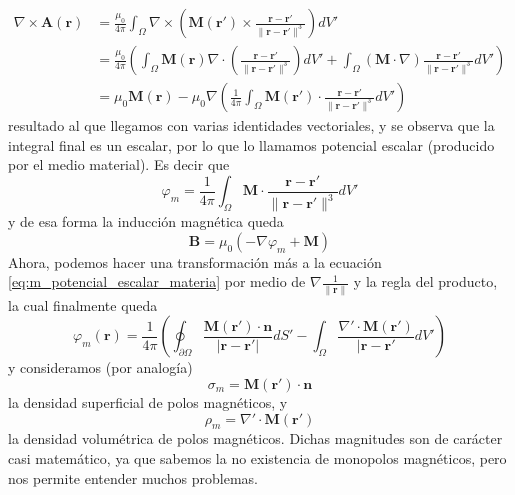 \documentclass[11pt,a4paper]{article}
\numberwithin{equation}{section}
\begin{document}
\begin{align*}
    \nabla \times \textbf{A}(\textbf{r}) &= \frac{\mu_0}{4\pi} \int_\Omega \nabla \times \left(\textbf{M}(\textbf{r}') \times \frac{\textbf{r} - \textbf{r}'}{\|\textbf{r} - \textbf{r}'\|^3}\right) dV' \\ &= \frac{\mu_0}{4\pi} \left(\int_{\Omega} \textbf{M}(\textbf{r}) \nabla\cdot\left(\frac{\textbf{r} - \textbf{r}'}{\|\textbf{r} - \textbf{r}'\|^3}\right) dV' + \int_{\Omega} (\textbf{M} \cdot \nabla) \frac{\textbf{r} - \textbf{r}'}{\|\textbf{r} - \textbf{r}'\|^3} dV'\right)\\ &= \mu_0 \textbf{M}(\textbf{r}) - \mu_0 \nabla\left(\frac{1}{4\pi} \int_\Omega \textbf{M}(\textbf{r}') \cdot \frac{\textbf{r} - \textbf{r}'}{\|\textbf{r} - \textbf{r}'\|^3} dV'\right)
\end{align*}
resultado al que llegamos con varias identidades vectoriales, y se observa que la integral final es un escalar, por lo que lo llamamos potencial escalar (producido por el medio material). Es decir que
\begin{equation}
    \varphi_m = \frac{1}{4\pi} \int_\Omega \textbf{M} \cdot \frac{\textbf{r} - \textbf{r}'}{\|\textbf{r} - \textbf{r}'\|^3} dV'
    \label{eq:m_potencial_escalar_materia}
\end{equation}
y de esa forma la inducción magnética queda
\begin{equation}
    \textbf{B} = \mu_0 (- \nabla\varphi_m + \textbf{M})
    \label{eq:m_induccion_materia}
\end{equation}
Ahora, podemos hacer una transformación más a la ecuación \ref{eq:m_potencial_escalar_materia} por medio de $\nabla \frac{1}{\|\textbf{r}\|}$ y la regla del producto, la cual finalmente queda
\begin{equation}
    \varphi_m(\textbf{r}) = \frac{1}{4\pi} \left(\oint_{\partial \Omega} \frac{\textbf{M}(\textbf{r}') \cdot \textbf{n}}{|\textbf{r} - \textbf{r}'|} dS' - \int_\Omega \frac{\nabla' \cdot \textbf{M}(\textbf{r}')}{|\textbf{r} - \textbf{r}'} dV' \right)
    \label{eq:m_potencial_escalar_cargas}
\end{equation}
y consideramos (por analogía)
\begin{equation}
    \sigma_m = \textbf{M}(\textbf{r}') \cdot \textbf{n}
\end{equation}
la densidad superficial de polos magnéticos, y 
\begin{equation}
    \rho_m = \nabla' \cdot \textbf{M}(\textbf{r}')
\end{equation}
la densidad volumétrica de polos magnéticos. Dichas magnitudes son de carácter casi matemático, ya que sabemos la no existencia de monopolos magnéticos, pero nos permite entender muchos problemas.
\end{document}
